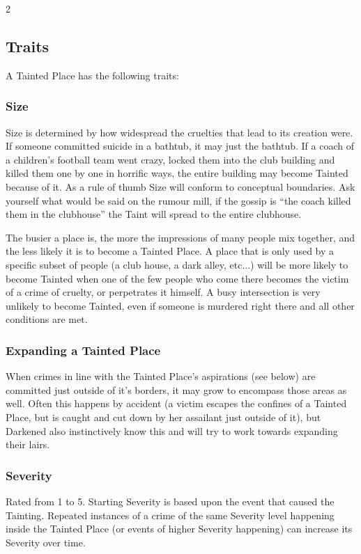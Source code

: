\begin{multicols}{2}
\subsection*{Traits}

A Tainted Place has the following traits:

\subsubsection*{Size}

Size is determined by how widespread the cruelties that lead to its creation were. If someone committed suicide in a bathtub, it may just the bathtub. If a coach of a children’s football team went crazy, locked them into the club building and killed them one by one in horrific ways, the entire building may become Tainted because of it. As a rule of thumb Size will conform to conceptual boundaries. Ask yourself what would be said on the rumour mill, if the gossip is “the coach killed them in the clubhouse” the Taint will spread to the entire clubhouse.

The busier a place is, the more the impressions of many people mix together, and the less likely it is to become a Tainted Place. A place that is only used by a specific subset of people (a club house, a dark alley, etc...) will be more likely to become Tainted when one of the few people who come there becomes the victim of a crime of cruelty, or perpetrates it himself. A busy intersection is very unlikely to become Tainted, even if someone is murdered right there and all other conditions are met.

\subsubsection*{Expanding a Tainted Place}

When crimes in line with the Tainted Place’s aspirations (see below) are committed just outside of it's borders, it may grow to encompass those areas as well. Often this happens by accident (a victim escapes the confines of a Tainted Place, but is caught and cut down by her assailant just outside of it), but Darkened also instinctively know this and will try to work towards expanding their lairs.

\subsubsection*{Severity}

Rated from 1 to 5. Starting Severity is based upon the event that caused the Tainting. Repeated instances of a crime of the same Severity level happening inside the Tainted Place (or events of higher Severity happening) can increase its Severity over time.


\end{multicols}
